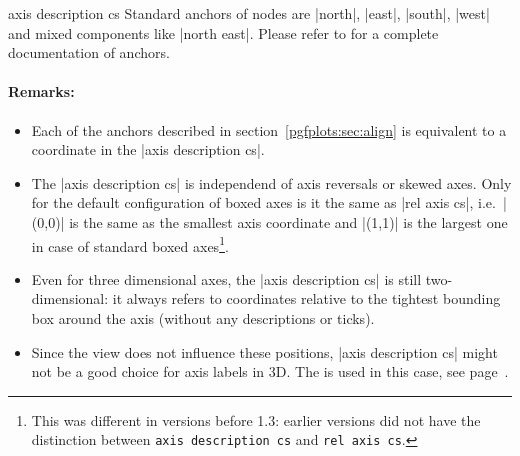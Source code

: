 \begin{coordinatesystem}{axis description cs}
	Standard anchors of nodes are |north|, |east|, |south|, |west| and mixed components like |north east|.
	Please refer to \cite{tikz} for a complete documentation of anchors.

\paragraph{Remarks:} 
\begin{itemize}
	\item Each of the anchors described in section~\ref{pgfplots:sec:align} is equivalent to a coordinate in the |axis description cs|.
	\item The |axis description cs| is independend of axis reversals or skewed axes.
	Only for the default configuration of boxed axes is it the same as |rel axis cs|, i.e.\ |(0,0)| is the same as the smallest axis coordinate and |(1,1)| is the largest one in case of standard boxed axes\footnote{This was different in versions before 1.3: earlier versions did not have the distinction between \texttt{axis description cs} and \texttt{rel axis cs}.}.

	\item Even for three dimensional axes, the |axis description cs| is still two-dimensional: it always refers to coordinates relative to the tightest bounding box around the axis (without any descriptions or ticks).
\begin{codeexample}[width=4cm]
\end{codeexample}
	
	\item Since the view does not influence these positions, |axis description cs| might not be a good choice for axis labels in 3D. The  is used in this case, see page~\pageref{sec:ticklabelcs}.
\end{itemize}
\end{coordinatesystem}

